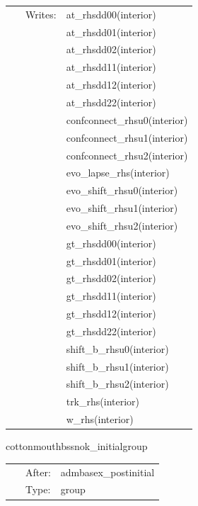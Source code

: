 \documentclass{article}
\begin{document}
\begin{tabular*}{160mm}{cll}
~ & Writes:  & at\_rhsdd00(interior) \\ 
~& ~ &at\_rhsdd01(interior)\\ 
~& ~ &at\_rhsdd02(interior)\\ 
~& ~ &at\_rhsdd11(interior)\\ 
~& ~ &at\_rhsdd12(interior)\\ 
~& ~ &at\_rhsdd22(interior)\\ 
~& ~ &confconnect\_rhsu0(interior)\\ 
~& ~ &confconnect\_rhsu1(interior)\\ 
~& ~ &confconnect\_rhsu2(interior)\\ 
~& ~ &evo\_lapse\_rhs(interior)\\ 
~& ~ &evo\_shift\_rhsu0(interior)\\ 
~& ~ &evo\_shift\_rhsu1(interior)\\ 
~& ~ &evo\_shift\_rhsu2(interior)\\ 
~& ~ &gt\_rhsdd00(interior)\\ 
~& ~ &gt\_rhsdd01(interior)\\ 
~& ~ &gt\_rhsdd02(interior)\\ 
~& ~ &gt\_rhsdd11(interior)\\ 
~& ~ &gt\_rhsdd12(interior)\\ 
~& ~ &gt\_rhsdd22(interior)\\ 
~& ~ &shift\_b\_rhsu0(interior)\\ 
~& ~ &shift\_b\_rhsu1(interior)\\ 
~& ~ &shift\_b\_rhsu2(interior)\\ 
~& ~ &trk\_rhs(interior)\\ 
~& ~ &w\_rhs(interior)\\ 
\end{tabular*} 


\vspace{5mm}


\hspace{5mm} cottonmouthbssnok\_initialgroup 

\hspace{5mm}{\it bssnok initialization routines } 


\hspace{5mm}

 \begin{tabular*}{160mm}{cll} 
~ & After:  & admbasex\_postinitial \\ 
~ & Type:  & group \\ 
\end{tabular*} 
\end{document}
